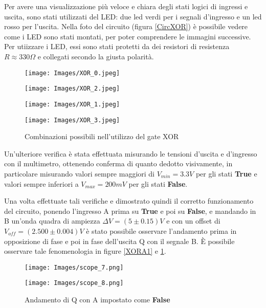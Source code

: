 \documentclass{article}
\begin{document}
    Per avere una visualizzazione più veloce e chiara degli stati logici di ingressi e uscita, sono stati utilizzati del LED: due led verdi per i segnali d'ingresso e un led rosso per l'uscita. Nella foto del circuito (figura \ref{CircXOR}) è possibile vedere come i LED sono stati montati, per poter comprendere le immagini successive.
    Per utiizzare i LED, essi sono stati protetti da dei resistori di resistenza $R\approx330\Omega$ e collegati secondo la giusta polarità.
    
    
    
    \begin{figure}[H]
    \captionsetup{labelformat=empty}
      \centering
      \texttt{[image: Images/XOR\_0.jpeg]}
      \caption{Configurazione 0 0 0}
    \endminipage
    \hspace{0.7cm}
      \centering
      \texttt{[image: Images/XOR\_2.jpeg]}
      \caption{Configurazione 0 1 1}
    \endminipage\hfill
     \centering
      \texttt{[image: Images/XOR\_1.jpeg]}
      \caption{Configurazione 1 0 1}
    \endminipage
    \hspace{0.7cm}
     \centering
      \texttt{[image: Images/XOR\_3.jpeg]}
      \caption{Configurazione 1 1 0}
    \endminipage\hfill
    \caption{Combinazioni possibili nell'utilizzo del gate XOR}
    \end{figure}
    
    Un'ulteriore verifica è stata effettuata misurando le tensioni d'uscita e d'ingresso con il multimetro, ottenendo conferma di quanto dedotto visivamente, in particolare misurando valori sempre maggiori di $V_{min}=3.3V$ per gli stati \textbf{True} e valori sempre inferiori a $V_{max}=200mV$ per gli stati \textbf{False}.
    
    Una volta effettuate tali verifiche e dimostrato quindi il corretto funzionamento del circuito, ponendo l'ingresso A prima su \textbf{True} e poi su \textbf{False}, e mandando in B un'onda quadra di ampiezza $\Delta V = (5\pm0.15)V$ e con un offset di $V_{off}=(2.500\pm0.004)V$ è stato possibile osservare l'andamento prima in opposizione di fase e poi in fase dell'uscita Q con il segnale B. È possibile osservare tale fenomenologia in figure \ref{XORA1} e \ref{XORA0}.
    
    \begin{figure}[H]
          \centering
          \texttt{[image: Images/scope\_7.png]}
          \caption{Andamento di Q con A impostato come \textbf{True}}
          \label{XORA1}
        \endminipage
        \hspace{0.7cm}
          \centering
          \texttt{[image: Images/scope\_8.png]}
          \caption{Andamento di Q con A impostato come \textbf{False}}
          \label{XORA0}
        \endminipage\hfill
    \end{figure}
    
\end{document}

